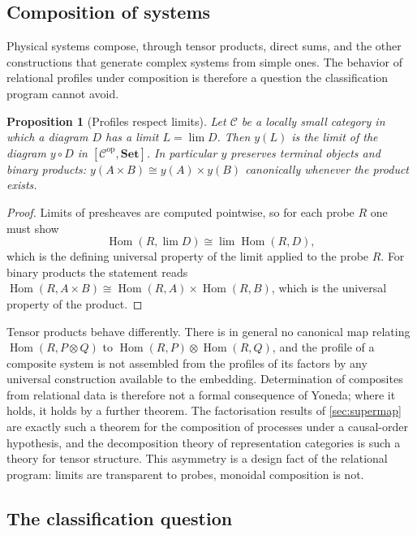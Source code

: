 \documentclass[11pt,letterpaper]{article}
\DeclareMathOperator{\Hom}{Hom}
\newtheorem{proposition}[theorem]{Proposition}
\theoremstyle{definition}
\theoremstyle{remark}
\begin{document}
\subsection{Composition of systems}
\label{sec:composition}

Physical systems compose, through tensor products, direct sums, and the other constructions that generate complex systems from simple ones. The behavior of relational profiles under composition is therefore a question the classification program cannot avoid.

\begin{proposition}[Profiles respect limits]
\label{prop:limits}
Let $\mathcal{C}$ be a locally small category in which a diagram $D$ has a limit $L = \lim D$. Then $y(L)$ is the limit of the diagram $y \circ D$ in $[\mathcal{C}^{\mathrm{op}}, \mathbf{Set}]$. In particular $y$ preserves terminal objects and binary products: $y(A \times B) \cong y(A) \times y(B)$ canonically whenever the product exists.
\end{proposition}

\begin{proof}
Limits of presheaves are computed pointwise, so for each probe $R$ one must show
\[
\Hom(R, \lim D) \cong \lim \Hom(R, D),
\]
which is the defining universal property of the limit applied to the probe $R$. For binary products the statement reads $\Hom(R, A \times B) \cong \Hom(R, A) \times \Hom(R, B)$, which is the universal property of the product.
\end{proof}

Tensor products behave differently. There is in general no canonical map relating $\Hom(R, P \otimes Q)$ to $\Hom(R, P) \otimes \Hom(R, Q)$, and the profile of a composite system is not assembled from the profiles of its factors by any universal construction available to the embedding. Determination of composites from relational data is therefore not a formal consequence of Yoneda; where it holds, it holds by a further theorem. The factorisation results of \cref{sec:supermap} are exactly such a theorem for the composition of processes under a causal-order hypothesis, and the decomposition theory of representation categories is such a theory for tensor structure. This asymmetry is a design fact of the relational program: limits are transparent to probes, monoidal composition is not.

\subsection{The classification question}
\label{sec:classification}
\end{document}
